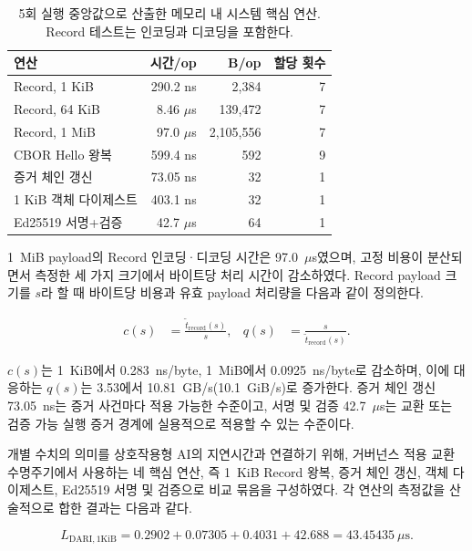 \documentclass[10pt]{article}
\begin{document}
\begin{table}[t]
\centering
\caption{5회 실행 중앙값으로 산출한 메모리 내 시스템 핵심 연산. Record 테스트는 인코딩과 디코딩을 포함한다.}
\label{tab:microbench}
\small
\begin{tabular}{@{}l r r r@{}}
\toprule
연산 & 시간/op & B/op & 할당 횟수 \\
\midrule
Record, 1 KiB & 290.2 ns & 2,384 & 7 \\
Record, 64 KiB & 8.46 $\mu$s & 139,472 & 7 \\
Record, 1 MiB & 97.0 $\mu$s & 2,105,556 & 7 \\
CBOR Hello 왕복 & 599.4 ns & 592 & 9 \\
증거 체인 갱신 & 73.05 ns & 32 & 1 \\
1 KiB 객체 다이제스트 & 403.1 ns & 32 & 1 \\
Ed25519 서명+검증 & 42.7 $\mu$s & 64 & 1 \\
\bottomrule
\end{tabular}
\end{table}

1~MiB payload의 Record 인코딩·디코딩 시간은 97.0~$\mu$s였으며, 고정 비용이 분산되면서 측정한 세 가지 크기에서 바이트당 처리 시간이 감소하였다. Record payload 크기를 $s$라 할 때 바이트당 비용과 유효 payload 처리량을 다음과 같이 정의한다.

\begin{align}
c(s) &= \frac{\widetilde{t}_{\mathrm{record}}(s)}{s},
  & q(s) &= \frac{s}{\widetilde{t}_{\mathrm{record}}(s)}.
\label{eq:normalized}
\end{align}

$c(s)$는 1~KiB에서 0.283~ns/byte, 1~MiB에서 0.0925~ns/byte로 감소하며, 이에 대응하는 $q(s)$는 3.53에서 10.81~GB/s(10.1~GiB/s)로 증가한다. 증거 체인 갱신 73.05~ns는 증거 사건마다 적용 가능한 수준이고, 서명 및 검증 42.7~$\mu$s는 교환 또는 검증 가능 실행 증거 경계에 실용적으로 적용할 수 있는 수준이다.

개별 수치의 의미를 상호작용형 AI의 지연시간과 연결하기 위해, 거버넌스 적용 교환 수명주기에서 사용하는 네 핵심 연산, 즉 1~KiB Record 왕복, 증거 체인 갱신, 객체 다이제스트, Ed25519 서명 및 검증으로 비교 묶음을 구성하였다. 각 연산의 측정값을 산술적으로 합한 결과는 다음과 같다.

\begin{equation}
L_{\mathrm{DARI},1\mathrm{KiB}}
= 0.2902 + 0.07305 + 0.4031 + 42.688
= 43.45435~\mu\mathrm{s}.
\label{eq:interactive-budget}
\end{equation}
\end{document}
